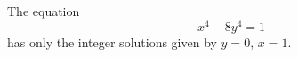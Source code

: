\begin{proposition}\label{eq:133}
    The equation
\[
    x^4-8y^4=1
\]
    has only the integer solutions given by $y=0$, $x=1$.
\end{proposition}
